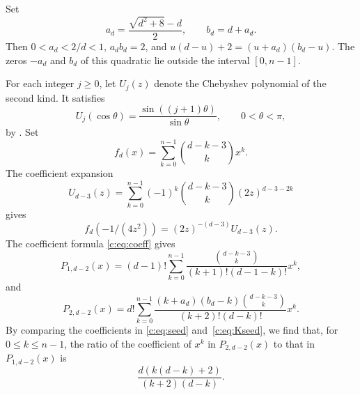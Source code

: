 \documentclass[10pt,a4paper]{article}
\numberwithin{equation}{section}
\theoremstyle{remark}\newtheorem{remark}[theorem]{Remark}
\begin{document}
Set
\begin{equation*}
 a_d=\frac{\sqrt{d^2+8}-d}{2},\qquad b_d=d+a_d.
\end{equation*}
Then $0<a_d<2/d<1$, $a_d b_d=2$, and $u(d-u)+2=(u+a_d)(b_d-u)$.
The zeros $-a_d$ and $b_d$ of this quadratic lie outside the interval
$[0,n-1]$.

For each integer $j\ge0$, let $U_j(z)$ denote the Chebyshev polynomial
of the second kind. It satisfies
\[
 U_j(\cos\theta)=\frac{\sin((j+1)\theta)}{\sin\theta},
 \qquad 0<\theta<\pi,
\]
by \cite[Eq.~(18.5.2)]{DLMF}. Set
\[
 f_d(x)=\sum_{k=0}^{n-1}\binom{d-k-3}{k}x^k.
\]
The coefficient expansion
\[
 U_{d-3}(z)=\sum_{k=0}^{n-1}(-1)^k
 \binom{d-k-3}{k}(2z)^{d-3-2k}
\]
gives
\begin{equation}\label{c:eq:Cheb}
 f_d(-1/(4z^2))=(2z)^{-(d-3)}U_{d-3}(z).
\end{equation}
The coefficient formula \eqref{c:eq:coeff} gives
\begin{equation}
 P_{1,d-2}(x)=(d-1)!\sum_{k=0}^{n-1}
 \frac{\binom{d-k-3}{k}}{(k+1)!(d-1-k)!}x^k,\label{c:eq:seed}
\end{equation}
and
\begin{equation}
 P_{2,d-2}(x)=d!\sum_{k=0}^{n-1}
 \frac{(k+a_d)(b_d-k)\binom{d-k-3}{k}}{(k+2)!(d-k)!}x^k.
 \label{c:eq:Kseed}
\end{equation}
By comparing the coefficients in \eqref{c:eq:seed} and~\eqref{c:eq:Kseed},
we find that, for $0\le k\le n-1$, the ratio of the coefficient of $x^k$ in
$P_{2,d-2}(x)$ to that in $P_{1,d-2}(x)$ is
\begin{equation}\label{c:eq:Kcoeff}
 \frac{d(k(d-k)+2)}{(k+2)(d-k)}.
\end{equation}
\end{document}
